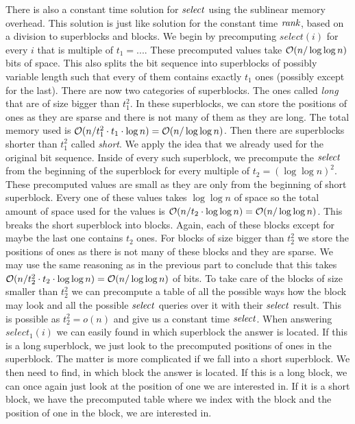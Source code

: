 There is also a constant time solution for $\mathit{select}$ using the sublinear memory overhead.
This solution is just like solution for the constant time $\mathit{rank}$, based on a division
to superblocks and blocks. We begin by precomputing $select(i)$ for every $i$ that is
multiple of $t_1=...$. These precomputed values take $\mathcal{O}(n/\log\log n)$ bits of space.
This also splits the bit sequence into superblocks of possibly variable length such that
every of them contains exactly $t_1$ ones (possibly except for the last). There are
now two categories of superblocks. The ones called \textit{long} that are of size bigger
than $t_1^2$. In these superblocks, we can store the positions of ones as they are sparse
and there is not many of them as they are long. The total memory used is $\mathcal{O}(n/t_1^2\cdot t_1\cdot
\log n) = \mathcal{O}(n/\log\log n)$. Then there are superblocks shorter than $t_1^2$ called
\textit{short}. We apply the idea that we already used for the original bit sequence. Inside of
every such superblock, we precompute the $\mathit{select}$ from the beginning of the superblock for every
multiple of $t_2=(\log\log n)^2$. These precomputed values are small as they are only from the
beginning of short superblock. Every one of these values takes $\log\log n$ of space so the
total amount of space used for the values is $\mathcal{O}(n/t_2\cdot \log\log n) = \mathcal{O}(n/\log\log n)$.
This breaks the short superblock into blocks. Again, each of these blocks except for maybe the
last one contains $t_2$ ones. For blocks of size bigger than $t_2^2$ we store the positions of
ones as there is not many of these blocks and they are sparse. We may use the same reasoning as
in the previous part to conclude that this takes $\mathcal{O}(n/t_2^2\cdot t_2\cdot \log\log n) = \mathcal{O}(n/\log\log n)$
of bits. To take care of the blocks of size smaller than $t_2^2$ we can precompute a table of all
the possible ways how the block may look and all the possible $\mathit{select}$ queries over it with
their $\mathit{select}$ result. This is possible as $t_2^2 = o(n)$ and give us a constant time $\mathit{select}$.
When answering $select_1(i)$ we can easily found in which superblock the answer is located. If this
is a long superblock, we just look to the precomputed positions of ones in the superblock. The matter
is more complicated if we fall into a short superblock. We then need to find, in which block the answer
is located. If this is a long block, we can once again just look at the position of one we are interested
in. If it is a short block, we have the precomputed table where we index with the block and the position of
one in the block, we are interested in.

